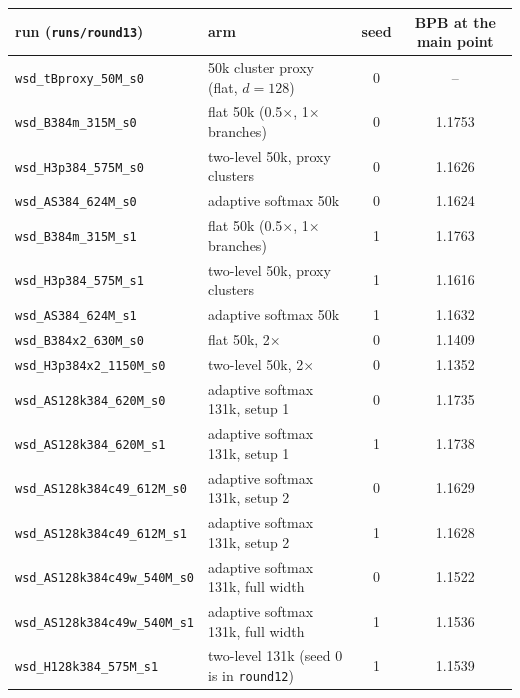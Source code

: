 \begin{tabular}{llcc}
\toprule
run (\texttt{runs/round13}) & arm & seed & BPB at the main point \\
\midrule
\texttt{wsd\_tBproxy\_50M\_s0} & 50k cluster proxy (flat, $d=128$) & 0 & -- \\
\texttt{wsd\_B384m\_315M\_s0} & flat 50k (0.5$\times$, 1$\times$ branches) & 0 & 1.1753 \\
\texttt{wsd\_H3p384\_575M\_s0} & two-level 50k, proxy clusters & 0 & 1.1626 \\
\texttt{wsd\_AS384\_624M\_s0} & adaptive softmax 50k & 0 & 1.1624 \\
\texttt{wsd\_B384m\_315M\_s1} & flat 50k (0.5$\times$, 1$\times$ branches) & 1 & 1.1763 \\
\texttt{wsd\_H3p384\_575M\_s1} & two-level 50k, proxy clusters & 1 & 1.1616 \\
\texttt{wsd\_AS384\_624M\_s1} & adaptive softmax 50k & 1 & 1.1632 \\
\texttt{wsd\_B384x2\_630M\_s0} & flat 50k, 2$\times$ & 0 & 1.1409 \\
\texttt{wsd\_H3p384x2\_1150M\_s0} & two-level 50k, 2$\times$ & 0 & 1.1352 \\
\texttt{wsd\_AS128k384\_620M\_s0} & adaptive softmax 131k, setup 1 & 0 & 1.1735 \\
\texttt{wsd\_AS128k384\_620M\_s1} & adaptive softmax 131k, setup 1 & 1 & 1.1738 \\
\texttt{wsd\_AS128k384c49\_612M\_s0} & adaptive softmax 131k, setup 2 & 0 & 1.1629 \\
\texttt{wsd\_AS128k384c49\_612M\_s1} & adaptive softmax 131k, setup 2 & 1 & 1.1628 \\
\texttt{wsd\_AS128k384c49w\_540M\_s0} & adaptive softmax 131k, full width & 0 & 1.1522 \\
\texttt{wsd\_AS128k384c49w\_540M\_s1} & adaptive softmax 131k, full width & 1 & 1.1536 \\
\texttt{wsd\_H128k384\_575M\_s1} & two-level 131k (seed 0 is in \texttt{round12}) & 1 & 1.1539 \\
\bottomrule
\end{tabular}
